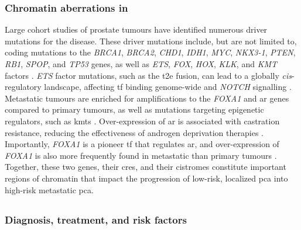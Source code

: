 \subsubsection{Chromatin aberrations in }

Large cohort studies of prostate tumours have identified numerous driver mutations for the disease.
These driver mutations include, but are not limited to, coding mutations to the \emph{BRCA1}, \emph{BRCA2}, \emph{CHD1}, \emph{IDH1}, \emph{MYC}, \emph{NKX3-1}, \emph{PTEN}, \emph{RB1}, \emph{SPOP}, and \emph{TP53} genes, as well as \emph{ETS}, \emph{FOX}, \emph{HOX}, \emph{KLK}, and \emph{KMT} factors \cite{fraserGenomicHallmarksLocalized2017,pcf/su2cinternationalprostatecancerdreamteamLongTailOncogenic2018,abeshouseMolecularTaxonomyPrimary2015}.
\emph{ETS} factor mutations, such as the \gls{t2e} fusion, can lead to a globally \emph{cis}-regulatory landscape, affecting \gls{tf} binding genome-wide and \emph{NOTCH} signalling \cite{kronTMPRSS2ERGFusion2017}.
Metastatic tumours are enriched for amplifications to the \emph{FOXA1} and \gls{ar} genes compared to primary tumours, as well as mutations targeting epigenetic regulators, such as \glspl{kmt} \cite{grassoMutationalLandscapeLethal2012,robinsonIntegrativeClinicalGenomics2015,quigleyGenomicHallmarksStructural2018}.
Over-expression of \gls{ar} is associated with castration resistance, reducing the effectiveness of androgen deprivation therapies \cite{quigleyGenomicHallmarksStructural2018,daskivichRecentProgressHormonal2006}.
Importantly, \emph{FOXA1} is a pioneer \gls{tf} that regulates \gls{ar}, and over-expression of \emph{FOXA1} is also more frequently found in metastatic than primary tumours \cite{tengPioneerProstateCancer2021}.
Together, these two genes, their \glspl{cre}, and their cistromes constitute important regions of chromatin that impact the progression of low-risk, localized \gls{pca} into high-risk metastatic \gls{pca}.

\subsection{}

\subsubsection{Diagnosis, treatment, and risk factors}

